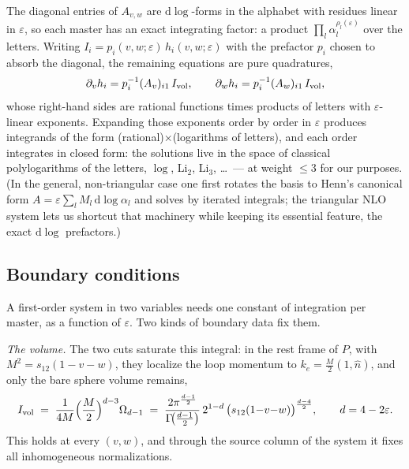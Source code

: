 \documentclass[11pt]{article}
\newcommand{\eps}{\varepsilon}
\newcommand{\dd}{\mathrm{d}}
\newcommand{\Li}{\mathrm{Li}}
\begin{document}
The diagonal entries of $A_{v,w}$ are $\dd\log$-forms in the alphabet
with residues linear in $\eps$, so each master has an exact
integrating factor: a product $\prod_l \alpha_l^{\rho_l(\eps)}$ over
the letters.  Writing $I_i = p_i(v,w;\eps)\, h_i(v,w;\eps)$ with the
prefactor $p_i$ chosen to absorb the diagonal, the remaining
equations are pure quadratures,
\begin{equation}
  \partial_v h_i = p_i^{-1} (A_v)_{i1}\, I_{\rm vol},
  \qquad
  \partial_w h_i = p_i^{-1} (A_w)_{i1}\, I_{\rm vol},
\end{equation}
whose right-hand sides are rational functions times products of
letters with $\eps$-linear exponents.  Expanding those exponents
order by order in $\eps$ produces integrands of the form
(rational)$\times$(logarithms of letters), and each order integrates
in closed form: the solutions live in the space of classical
polylogarithms of the letters, $\log$, $\Li_2$, $\Li_3$, \dots\ ---
at weight $\le 3$ for our purposes.  (In the general, non-triangular
case one first rotates the basis to Henn's canonical form
$A = \eps \sum_l M_l\, \dd\log \alpha_l$ and solves by iterated
integrals; the triangular NLO system lets us shortcut that machinery
while keeping its essential feature, the exact $\dd\log$ prefactors.)

\subsection{Boundary conditions}

A first-order system in two variables needs one constant of
integration per master, as a function of $\eps$.  Two kinds of
boundary data fix them.

\emph{The volume.}  The two cuts saturate this integral: in the rest
frame of $P$, with $M^2 = s_{12}(1-v-w)$, they localize the loop
momentum to $k_e = \tfrac{M}{2}(1, \hat n)$, and only the bare
sphere volume remains,
\begin{equation}
  I_{\rm vol}
  \;=\;
  \frac{1}{4M}\Big(\frac{M}{2}\Big)^{d-3} \Omega_{d-1}
  \;=\;
  \frac{2\pi^{\frac{d-1}{2}}}{\Gamma\!\big(\tfrac{d-1}{2}\big)}\,
  2^{1-d}\, \big(s_{12}(1{-}v{-}w)\big)^{\frac{d-4}{2}} ,
  \qquad d = 4-2\eps .
  \label{eq:volume}
\end{equation}
This holds at every $(v,w)$, and through the source column of the
system it fixes all inhomogeneous normalizations.
\end{document}
